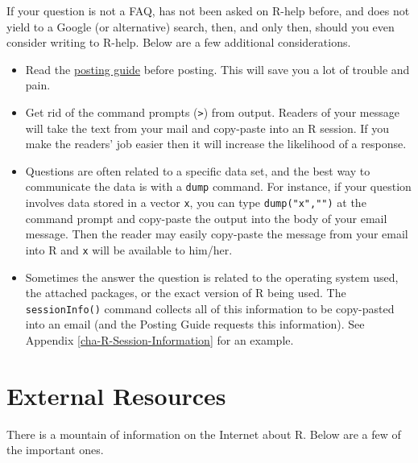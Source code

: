 \documentclass[]{book}
\providecommand{\tightlist}{%
  \setlength{\itemsep}{0pt}\setlength{\parskip}{0pt}}
\numberwithin{equation}{chapter}
\numberwithin{figure}{chapter}
\theoremstyle{plain}
\theoremstyle{definition}
\theoremstyle{remark}
\theoremstyle{definition}
\theoremstyle{definition}
\theoremstyle{remark}
\begin{document}
If your question is not a FAQ, has not been asked on R-help before, and
does not yield to a Google (or alternative) search, then, and only then,
should you even consider writing to R-help. Below are a few additional
considerations.

\begin{itemize}
\tightlist
\item
  Read the \href{http://www.r-project.org/posting-guide.html}{posting
  guide} before posting. This will save you a lot of trouble and pain.
\item
  Get rid of the command prompts (\texttt{\textgreater{}}) from output.
  Readers of your message will take the text from your mail and
  copy-paste into an R session. If you make the readers' job easier then
  it will increase the likelihood of a response.
\item
  Questions are often related to a specific data set, and the best way
  to communicate the data is with a \texttt{dump}
   command. For instance, if your question
  involves data stored in a vector \texttt{x}, you can type
  \texttt{dump("x","")} at the command prompt and copy-paste the output
  into the body of your email message. Then the reader may easily
  copy-paste the message from your email into R and \texttt{x} will be
  available to him/her.
\item
  Sometimes the answer the question is related to the operating system
  used, the attached packages, or the exact version of R being used. The
  \texttt{sessionInfo()} 
  command collects all of this information to be copy-pasted into an
  email (and the Posting Guide requests this information). See Appendix
  \ref{cha-R-Session-Information} for an example.
\end{itemize}

\section{External Resources}\label{sec-External-Resources}

There is a mountain of information on the Internet about R. Below are a
few of the important ones.
\end{document}
